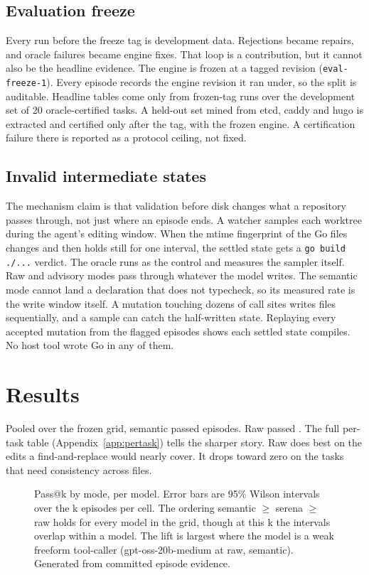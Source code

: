 \documentclass[11pt]{article}
\begin{document}
\subsection{Evaluation freeze}
Every run before the freeze tag is development data. Rejections became
repairs, and oracle failures became engine fixes. That loop is a
contribution, but it cannot also be the headline evidence. The engine
is frozen at a tagged revision (\texttt{eval-freeze-1}). Every episode
records the engine revision it ran under, so the split is auditable.
Headline tables come only from frozen-tag runs over the development set
of 20 oracle-certified tasks. A held-out set mined from etcd, caddy and hugo is extracted and certified only after the tag, with the frozen
engine. A certification failure there is reported as a protocol
ceiling, not fixed.

\subsection{Invalid intermediate states}
The mechanism claim is that validation before disk changes what a
repository passes through, not just where an episode ends. A watcher
samples each worktree during the agent's editing window. When the mtime
fingerprint of the Go files changes and then holds still for one
interval, the settled state gets a \texttt{go build ./...} verdict. The
oracle runs as the control and measures the sampler itself. Raw and
advisory modes pass through whatever the model writes. The semantic
mode cannot land a declaration that does not typecheck, so its measured
rate is the write window itself. A mutation touching dozens of call
sites writes files sequentially, and a sample can catch the half-written
state. Replaying every accepted mutation from the flagged episodes
shows each settled state compiles. No host tool wrote Go in any of them.

\section{Results}
Pooled over the frozen grid, semantic passed \SemanticPassCount{}
episodes. Raw passed \RawPassCount{}. The full per-task table
(Appendix~\ref{app:pertask}) tells the sharper story. Raw does best on
the edits a find-and-replace would nearly cover. It drops toward zero on the tasks that need consistency across files.

\begin{figure}[tbp]
\centering

\caption{Pass@k by mode, per model. Error bars are 95\% Wilson
intervals over the k episodes per cell. The ordering semantic $\ge$
serena $\ge$ raw holds for every model in the grid, though at this k the
intervals overlap within a model. The lift is largest where the model is
a weak freeform tool-caller (gpt-oss-20b-medium at \GptOssRawPass{} raw,
\GptOssSemanticPass{} semantic). Generated from committed episode
evidence.}
\label{fig:pass}
\end{figure}
\end{document}
